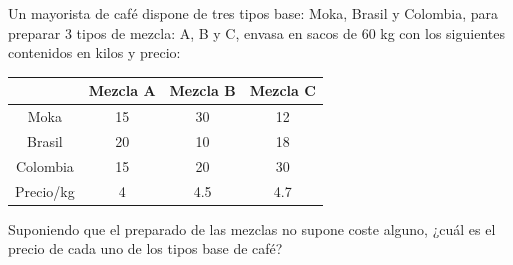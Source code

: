 \documentclass[spanish, 11pt]{exam}
\begin{document}
\begin{questions}

\question Un mayorista de café dispone de tres tipos base:  Moka, Brasil y Colombia, para preparar 3 tipos de mezcla: A, B y C, envasa en sacos de 60 kg con los siguientes contenidos en kilos y precio: \\
\begin{tabular}{|c|c|c|c|}
\hline
& Mezcla A & Mezcla B & Mezcla C \\
\hline
Moka & 15 & 30 & 12 \\
\hline
Brasil & 20 & 10 & 18 \\
\hline
Colombia & 15 & 20 & 30 \\
\hline
Precio/kg & 4 & 4.5 & 4.7 \\
\hline
\end{tabular}

Suponiendo que el preparado de las mezclas no supone coste alguno, ¿cuál es el precio de cada uno de los tipos base de café?


\end{questions}
\end{document}
